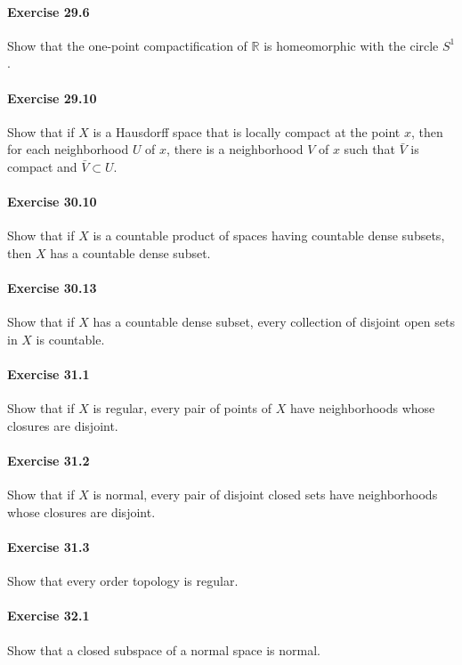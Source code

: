 \documentclass{article}
\begin{document}
\paragraph{Exercise 29.6} Show that the one-point compactification of $\mathbb{R}$ is homeomorphic with the circle $S^1$.

\paragraph{Exercise 29.10} Show that if $X$ is a Hausdorff space that is locally compact at the point $x$, then for each neighborhood $U$ of $x$, there is a neighborhood $V$ of $x$ such that $\bar{V}$ is compact and $\bar{V} \subset U$.

\paragraph{Exercise 30.10} Show that if $X$ is a countable product of spaces having countable dense subsets, then $X$ has a countable dense subset.

\paragraph{Exercise 30.13} Show that if $X$ has a countable dense subset, every collection of disjoint open sets in $X$ is countable.

\paragraph{Exercise 31.1} Show that if $X$ is regular, every pair of points of $X$ have neighborhoods whose closures are disjoint.

\paragraph{Exercise 31.2} Show that if $X$ is normal, every pair of disjoint closed sets have neighborhoods whose closures are disjoint.

\paragraph{Exercise 31.3} Show that every order topology is regular.

\paragraph{Exercise 32.1} Show that a closed subspace of a normal space is normal.
\end{document}
